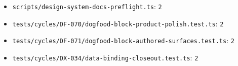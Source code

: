 \begin{itemize}
\item
  \texttt{s\allowbreak{}c\allowbreak{}r\allowbreak{}i\allowbreak{}p\allowbreak{}t\allowbreak{}s\allowbreak{}/\allowbreak{}d\allowbreak{}e\allowbreak{}s\allowbreak{}i\allowbreak{}g\allowbreak{}n\allowbreak{}-\allowbreak{}s\allowbreak{}y\allowbreak{}s\allowbreak{}t\allowbreak{}e\allowbreak{}m\allowbreak{}-\allowbreak{}d\allowbreak{}o\allowbreak{}c\allowbreak{}s\allowbreak{}-\allowbreak{}p\allowbreak{}r\allowbreak{}e\allowbreak{}f\allowbreak{}l\allowbreak{}i\allowbreak{}g\allowbreak{}h\allowbreak{}t\allowbreak{}.\allowbreak{}t\allowbreak{}s}: \texttt{2}
\item
  \texttt{t\allowbreak{}e\allowbreak{}s\allowbreak{}t\allowbreak{}s\allowbreak{}/\allowbreak{}c\allowbreak{}y\allowbreak{}c\allowbreak{}l\allowbreak{}e\allowbreak{}s\allowbreak{}/\allowbreak{}D\allowbreak{}F\allowbreak{}-\allowbreak{}0\allowbreak{}7\allowbreak{}0\allowbreak{}/\allowbreak{}d\allowbreak{}o\allowbreak{}g\allowbreak{}f\allowbreak{}o\allowbreak{}o\allowbreak{}d\allowbreak{}-\allowbreak{}b\allowbreak{}l\allowbreak{}o\allowbreak{}c\allowbreak{}k\allowbreak{}-\allowbreak{}p\allowbreak{}r\allowbreak{}o\allowbreak{}d\allowbreak{}u\allowbreak{}c\allowbreak{}t\allowbreak{}-\allowbreak{}p\allowbreak{}o\allowbreak{}l\allowbreak{}i\allowbreak{}s\allowbreak{}h\allowbreak{}.\allowbreak{}t\allowbreak{}e\allowbreak{}s\allowbreak{}t\allowbreak{}.\allowbreak{}t\allowbreak{}s}: \texttt{2}
\item
  \texttt{t\allowbreak{}e\allowbreak{}s\allowbreak{}t\allowbreak{}s\allowbreak{}/\allowbreak{}c\allowbreak{}y\allowbreak{}c\allowbreak{}l\allowbreak{}e\allowbreak{}s\allowbreak{}/\allowbreak{}D\allowbreak{}F\allowbreak{}-\allowbreak{}0\allowbreak{}7\allowbreak{}1\allowbreak{}/\allowbreak{}d\allowbreak{}o\allowbreak{}g\allowbreak{}f\allowbreak{}o\allowbreak{}o\allowbreak{}d\allowbreak{}-\allowbreak{}b\allowbreak{}l\allowbreak{}o\allowbreak{}c\allowbreak{}k\allowbreak{}-\allowbreak{}a\allowbreak{}u\allowbreak{}t\allowbreak{}h\allowbreak{}o\allowbreak{}r\allowbreak{}e\allowbreak{}d\allowbreak{}-\allowbreak{}s\allowbreak{}u\allowbreak{}r\allowbreak{}f\allowbreak{}a\allowbreak{}c\allowbreak{}e\allowbreak{}s\allowbreak{}.\allowbreak{}t\allowbreak{}e\allowbreak{}s\allowbreak{}t\allowbreak{}.\allowbreak{}t\allowbreak{}s}: \texttt{2}
\item
  \texttt{t\allowbreak{}e\allowbreak{}s\allowbreak{}t\allowbreak{}s\allowbreak{}/\allowbreak{}c\allowbreak{}y\allowbreak{}c\allowbreak{}l\allowbreak{}e\allowbreak{}s\allowbreak{}/\allowbreak{}D\allowbreak{}X\allowbreak{}-\allowbreak{}0\allowbreak{}3\allowbreak{}4\allowbreak{}/\allowbreak{}d\allowbreak{}a\allowbreak{}t\allowbreak{}a\allowbreak{}-\allowbreak{}b\allowbreak{}i\allowbreak{}n\allowbreak{}d\allowbreak{}i\allowbreak{}n\allowbreak{}g\allowbreak{}-\allowbreak{}c\allowbreak{}l\allowbreak{}o\allowbreak{}s\allowbreak{}e\allowbreak{}o\allowbreak{}u\allowbreak{}t\allowbreak{}.\allowbreak{}t\allowbreak{}e\allowbreak{}s\allowbreak{}t\allowbreak{}.\allowbreak{}t\allowbreak{}s}: \texttt{2}
\end{itemize}

